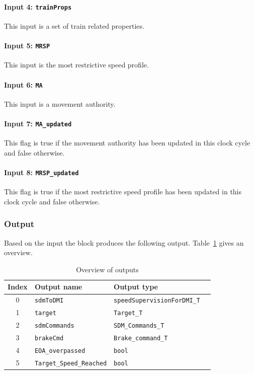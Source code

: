 \paragraph{Input 4: \texttt{trainProps}}
This input is a set of train related properties.
\paragraph{Input 5: \texttt{MRSP}}
This input is the most restrictive speed profile.
\paragraph{Input 6: \texttt{MA}}
This input is a movement authority.
\paragraph{Input 7: \texttt{MA\_updated}}
This flag is true if the movement authority has been updated in this clock cycle and false otherwise.
\paragraph{Input 8: \texttt{MRSP\_updated}}
This flag is true if the most restrictive speed profile has been updated in this clock cycle and false otherwise.



\subsubsection{Output}
Based on the input the block produces the following output. Table~\ref{tbl:speedsupervisionOutput} gives an overview.

\begin{table}[H]
  \begin{tabular}{| c | l | l | l |}
    \hline
    \textbf{Index} & \textbf{Output name} & \textbf{Output type}\\ \hline
    0 & \texttt{sdmToDMI} & \texttt{speedSupervisionForDMI\_T}\\
    1 & \texttt{target} & \texttt{Target\_T}\\
    2 & \texttt{sdmCommands} & \texttt{SDM\_Commands\_T}\\
    3 & \texttt{brakeCmd} & \texttt{Brake\_command\_T}\\
    4 & \texttt{EOA\_overpassed} & \texttt{bool}\\
    5 & \texttt{Target\_Speed\_Reached} & \texttt{bool}\\
    \hline
  \end{tabular} 
  \caption{Overview of outputs}
  \label{tbl:speedsupervisionOutput}
\end{table}

